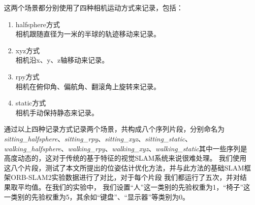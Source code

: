 这两个场景都分别使用了四种相机运动方式来记录，包括：
{
\setlist[enumerate]{}%
\begin{enumerate}[nosep]
    \item halfsphere方式\\相机跟随直径为一米的半球的轨迹移动来记录。
    \item xyz方式\\相机沿x、y、z轴移动来记录。
    \item rpy方式\\相机在俯仰角、偏航角、翻滚角上旋转来记录。
    \item static方式\\相机手动保持静态来记录。
\end{enumerate}
}

通过以上四种记录方式记录两个场景，共构成八个序列片段，分别命名为\emph{sitting\_halfsphere}、\emph{sitting\_rpy}、\emph{sitting\_xyz}、\emph{sitting\_static}、\emph{walking\_halfsphere}、\emph{walking\_rpy}、\emph{walking\_xyz}、\emph{walking\_static}其中一些序列是高度动态的，这对于传统的基于特征的视觉SLAM系统来说很难处理。
我们使用这八个片段，测试了本文所提出的位姿估计优化方法，并与此方法的基础SLAM框架ORB-SLAM2实验数据进行了对比，对于每个片段
我们都运行了五次，并对结果取平均值。在我们的实验中，
我们设置“人”这一类别的先验权重为1，“椅子”这一类别的先验权重为5，其余如“键盘”、“显示器”等类别为0。

